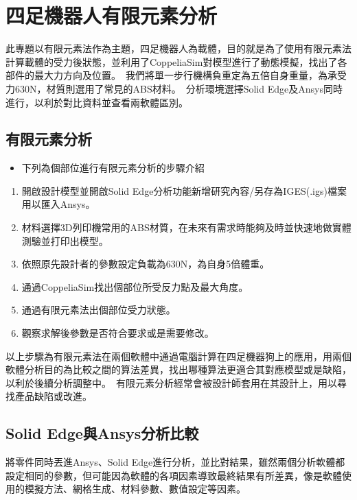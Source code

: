 \chapter{四足機器人有限元素分析}

此專題以有限元素法作為主題，四足機器人為載體，目的就是為了使用有限元素法計算載體的受力後狀態，並利用了CoppeliaSim對模型進行了動態模擬，找出了各部件的最大力方向及位置。\
我們將單一步行機構負重定為五倍自身重量，為承受力630N，材質則選用了常見的ABS材料。\
分析環境選擇Solid Edge及Ansys同時進行，以利於對比資料並查看兩軟體區別。\\

\section{有限元素分析}
\begin{itemize}
\item 下列為個部位進行有限元素分析的步驟介紹
\end{itemize}
\begin{enumerate}
\item 開啟設計模型並開啟Solid Edge分析功能新增研究內容/另存為IGES(.igs)檔案用以匯入Ansys。
\item 材料選擇3D列印機常用的ABS材質，在未來有需求時能夠及時並快速地做實體測驗並打印出模型。
\item 依照原先設計者的參數設定負載為630N，為自身5倍體重。
\item 通過CoppeliaSim找出個部位所受反力點及最大角度。
\item 通過有限元素法出個部位受力狀態。
\item 觀察求解後參數是否符合要求或是需要修改。\\

\end{enumerate}
以上步驟為有限元素法在兩個軟體中通過電腦計算在四足機器狗上的應用，用兩個軟體分析目的為比較之間的算法差異，找出哪種算法更適合其對應模型或是缺陷，以利於後續分析調整中。\
有限元素分析經常會被設計師套用在其設計上，用以尋找產品缺陷或改進。\
\newpage
\section{Solid Edge與Ansys分析比較}
將零件同時丟進Ansys、Solid Edge進行分析，並比對結果，雖然兩個分析軟體都設定相同的參數，但可能因為軟體的各項因素導致最終結果有所差異，像是軟體使用的模擬方法、網格生成、材料參數、數值設定等因素。\\

